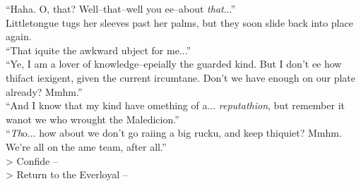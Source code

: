 “Haha. O, that? Well--that--well you \lisp ee--about \emph{that}...”\\

Littletongue tugs her sleeves past her palms, but they soon slide back into place again.\\
“That i\lispx quite the awkward \lisp ubject for me...”\\

“Ye\lisp , I am a lover of knowledge--e\lisp pe\lisp ially the guarded kind. But I don’t \lisp ee how thi\lispx fact i\lispx exigent, given the current \lisp ircum\lisp tan\lisp e\lisp . Don’t we have enough on our plate already? Mmhm.”\\

“And I know that my kind have \lisp omething of a... \emph{reputathion}, but remember it wa\lispx not we who wrought the Maledic\lisp ion.”\\

“\emph{Th}o... how about we don’t go rai\lisp ing a big rucku\lisp, and keep thi\lispx quiet? Mmhm. We’re all on the \lisp ame team, after all.”\\

> Confide -- \\
> Return to the Everloyal -- 